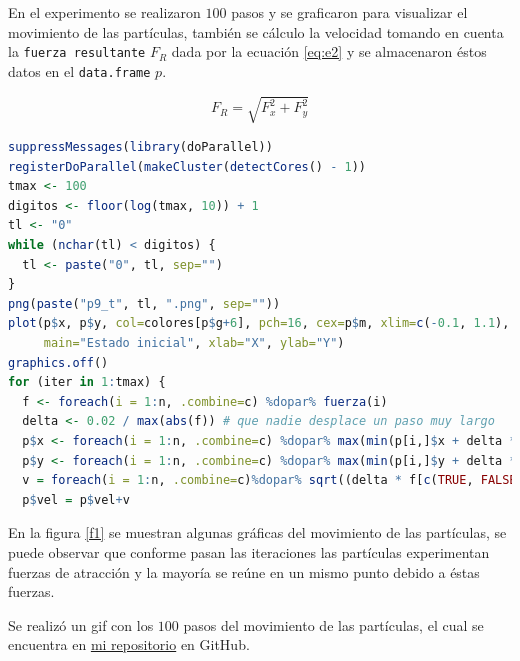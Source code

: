 \documentclass{article}
\begin{document}
En el experimento se realizaron $100$ pasos y se graficaron para visualizar el movimiento de las partículas, también se cálculo la velocidad tomando en cuenta la \texttt{fuerza resultante} $F_R$ dada por la ecuación \ref{eq:e2} y se almacenaron éstos datos en el \texttt{data.frame} $p$.

\begin{equation}
\label{eq:e2}
F_R= \sqrt{{F_x^{2} +F_y^{2}}} 
\end{equation}

\lstset{style=mystyle}
\begin{lstlisting}[language=R, caption= Código para obtener la velocidad de cada partícula.]
suppressMessages(library(doParallel))
registerDoParallel(makeCluster(detectCores() - 1))
tmax <- 100
digitos <- floor(log(tmax, 10)) + 1
tl <- "0"
while (nchar(tl) < digitos) {
  tl <- paste("0", tl, sep="")
}
png(paste("p9_t", tl, ".png", sep=""))
plot(p$x, p$y, col=colores[p$g+6], pch=16, cex=p$m, xlim=c(-0.1, 1.1), ylim=c(-0.1, 1.1),
     main="Estado inicial", xlab="X", ylab="Y")
graphics.off()
for (iter in 1:tmax) {
  f <- foreach(i = 1:n, .combine=c) %dopar% fuerza(i)
  delta <- 0.02 / max(abs(f)) # que nadie desplace un paso muy largo
  p$x <- foreach(i = 1:n, .combine=c) %dopar% max(min(p[i,]$x + delta * f[c(TRUE, FALSE)][i], 1), 0)
  p$y <- foreach(i = 1:n, .combine=c) %dopar% max(min(p[i,]$y + delta * f[c(FALSE, TRUE)][i], 1), 0)
  v = foreach(i = 1:n, .combine=c)%dopar% sqrt((delta * f[c(TRUE, FALSE)][i])^2 + (delta * f[c(FALSE, TRUE)][i])^2)
  p$vel = p$vel+v
\end{lstlisting}

En la figura \ref{f1} se muestran algunas gráficas del movimiento de las partículas, se puede observar que conforme pasan las iteraciones las partículas experimentan fuerzas de atracción y la mayoría se reúne en un mismo punto debido a éstas fuerzas. 
\bigskip

Se realizó un gif \citep{3} con los $100$ pasos del movimiento de las partículas, el cual se encuentra en \href{https://github.com/nataliaperez0/Simulation/tree/main/Tarea8}{mi repositorio} en GitHub.

\newpage
\end{document}
